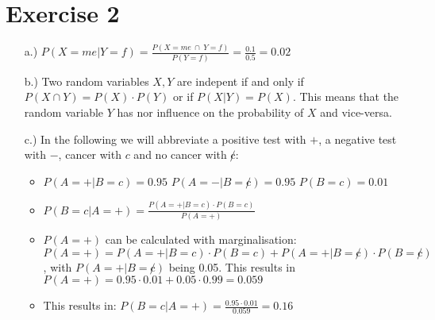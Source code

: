 \documentclass[%
   10pt,              %
   a4paper,           %
   DIV10,             %
]{scrartcl}%
\begin{document}
\section*{Exercise 2}
\begin{itemize}
	\item[a.)] $P(X=me|Y=f) = \frac{P(X=me~\cap~Y=f)}{P(Y=f)} = \frac{0.1}{0.5} = 0.02$
	\item[b.)] Two random variables $X,Y$ are indepent if and only if $P(X \cap Y) = P(X) \cdot P(Y)$ or if $P(X|Y) = P(X)$. This means that the random variable $Y$ has nor influence on the probability of $X$ and vice-versa.
	\item[c.)] In the following we will abbreviate a positive test with $+$, a negative test with $-$, cancer with $c$ and no cancer with $\not c$:
	\begin{itemize}
		\item $P(A=+|B=c) = 0.95$\newline
		\noindent $P(A=-|B=\not c) = 0.95$\newline
		\noindent $P(B=c) = 0.01$
		\item $P(B=c|A=+) = \frac{P(A=+|B=c) \cdot P(B=c)}{P(A=+)}$
		\item $P(A=+)$ can be calculated with marginalisation:\newline
		\noindent $P(A=+) = P(A=+|B=c) \cdot P(B=c) + P(A=+|B=\not c) \cdot P(B=\not c)$, with $P(A=+|B=\not c)$ being 0.05. This results in $P(A=+) = 0.95 \cdot 0.01 + 0.05 \cdot 0.99 = 0.059$
		\item This results in: $P(B=c|A=+) = \frac{0.95 \cdot 0.01}{0.059} = 0.16$
	\end{itemize}
\end{itemize}
\end{document}
